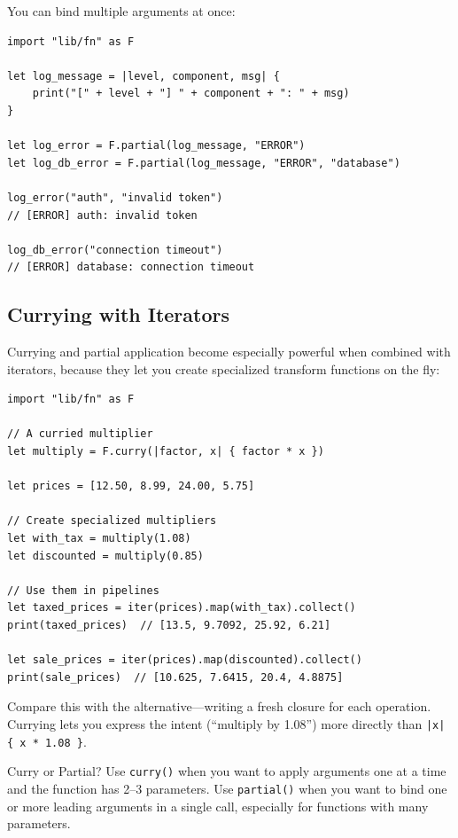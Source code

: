 You can bind multiple arguments at once:

\begin{lstlisting}[language=Lattice, caption={Binding multiple arguments}]
import "lib/fn" as F

let log_message = |level, component, msg| {
    print("[" + level + "] " + component + ": " + msg)
}

let log_error = F.partial(log_message, "ERROR")
let log_db_error = F.partial(log_message, "ERROR", "database")

log_error("auth", "invalid token")
// [ERROR] auth: invalid token

log_db_error("connection timeout")
// [ERROR] database: connection timeout
\end{lstlisting}

\subsection{Currying with Iterators}\label{subsec:curry-with-iterators}

Currying and partial application become especially powerful when combined with iterators, because they let you create specialized transform functions on the fly:

\begin{lstlisting}[language=Lattice, caption={Curried functions in pipelines}]
import "lib/fn" as F

// A curried multiplier
let multiply = F.curry(|factor, x| { factor * x })

let prices = [12.50, 8.99, 24.00, 5.75]

// Create specialized multipliers
let with_tax = multiply(1.08)
let discounted = multiply(0.85)

// Use them in pipelines
let taxed_prices = iter(prices).map(with_tax).collect()
print(taxed_prices)  // [13.5, 9.7092, 25.92, 6.21]

let sale_prices = iter(prices).map(discounted).collect()
print(sale_prices)  // [10.625, 7.6415, 20.4, 4.8875]
\end{lstlisting}

Compare this with the alternative---writing a fresh closure for each operation.
Currying lets you express the intent (``multiply by 1.08'') more directly than \lstinline+|x| { x * 1.08 }+.

\begin{tipbox}{Curry or Partial?}
Use \lstinline|curry()| when you want to apply arguments one at a time and the function has 2--3 parameters.
Use \lstinline|partial()| when you want to bind one or more leading arguments in a single call, especially for functions with many parameters.
\end{tipbox}

